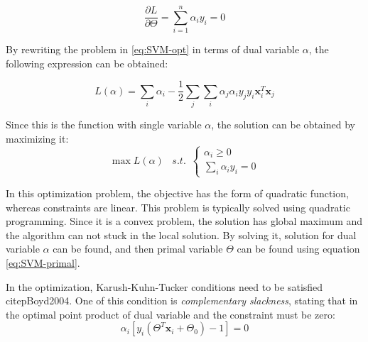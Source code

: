 \documentclass{article}
\begin{document}
\begin{equation} \label{eq:SVM-dual}
\frac{\partial L}{\partial \Theta} = \sum_{i=1}^n \alpha_i y_i = 0
\end{equation}

By rewriting the problem in \ref{eq:SVM-opt} in terms of dual variable $\alpha$, the following expression can be obtained:

\begin{equation} 
L(\alpha) = \sum_i \alpha_i - \frac{1}{2} \sum_j \sum_i \alpha_j \alpha_i y_j y_i \mathbf{x}_i^T \mathbf{x}_j
\end{equation}

Since this is the function with single variable $\alpha$, the solution can be obtained by maximizing it:
\begin{equation} 
\max L(\alpha) \,\,\,\,\, s.t. \,\,\, \left\{\begin{array}{lr} \alpha_i \geq 0 \\
\sum_{i} \alpha_i y_i = 0  \end{array}\right.
\end{equation}

In this optimization problem, the objective has the form of quadratic function, whereas constraints are linear. This problem is typically solved using quadratic programming. Since it is a convex problem, the solution has global maximum and the algorithm can not stuck in the local solution. By solving it, solution for dual variable $\alpha$ can be found, and then primal variable $\Theta$ can be found using equation \ref{eq:SVM-primal}.

In the optimization, Karush-Kuhn-Tucker conditions need to be satisfied citep{Boyd2004}. One of this condition is \emph{complementary slackness}, stating that in the optimal point product of dual variable and the constraint must be zero:
\begin{equation} 
\alpha_i \left[ y_i \left( \Theta^T\mathbf{x}_i + \Theta_0  \right) -1 \right] = 0
\end{equation}
\end{document}
